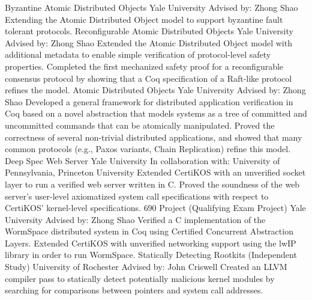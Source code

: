 \documentclass[10pt,letterpaper,sans]{moderncv}
\begin{document}
        {Byzantine Atomic Distributed Objects}
        {Yale University}
        {Advised by: Zhong Shao}
        {}
        {%
          Extending the Atomic Distributed Object model to support byzantine
          fault tolerant protocols.
        }
        {Reconfigurable Atomic Distributed Objects}
        {Yale University}
        {Advised by: Zhong Shao}
        {}
        {%
          Extended the Atomic Distributed Object model with additional metadata
          to enable simple verification of protocol-level safety properties.
          Completed the first mechanized safety proof for a reconfigurable
          consensus protocol by showing that a Coq specification of a Raft-like
          protocol refines the model.
        }
        {Atomic Distributed Objects}
        {Yale University}
        {Advised by: Zhong Shao}
        {}
        {%
          Developed a general framework for distributed application verification
          in Coq based on a novel abstraction that models systems as a tree of
          committed and uncommitted commands that can be atomically manipulated.
          Proved the correctness of several non-trivial distributed
          applications, and showed that many common protocols (e.g., Paxos
          variants, Chain Replication) refine this model.
        }
        {Deep Spec Web Server}
        {Yale University}
        {In collaboration with: University of Pennsylvania, Princeton University}
        {}
        {%
          Extended CertiKOS with an unverified socket layer to run a verified
          web server written in C.
          Proved the soundness of the web server's user-level axiomatized system
          call specifications with respect to CertiKOS' kernel-level specifications.
        }
        {690 Project (Qualifying Exam Project)}
        {Yale University}
        {Advised by: Zhong Shao}
        {}
        {%
          Verified a C implementation of the WormSpace distributed system in Coq
          using Certified Concurrent Abstraction Layers.
          Extended CertiKOS with unverified networking support using the lwIP
          library in order to run WormSpace.
        }
        {Statically Detecting Rootkits (Independent Study)}
        {University of Rochester}
        {Advised by: John Criswell}
        {}
        {%
          Created an LLVM compiler pass to statically detect potentially
          malicious kernel modules by searching for comparisons between pointers
          and system call addresses.
        }
\end{document}
